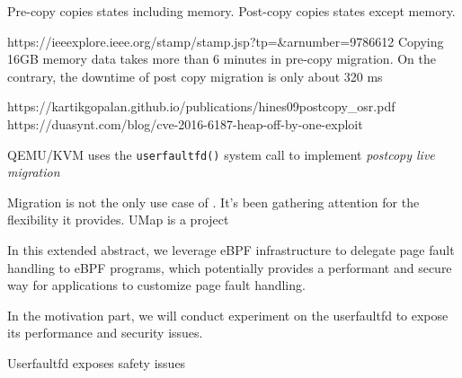 

Pre-copy copies states including memory. Post-copy copies states except memory.


https://ieeexplore.ieee.org/stamp/stamp.jsp?tp=&arnumber=9786612
Copying 16GB memory data takes more than 6 minutes in
pre-copy migration. On the contrary, the downtime of post copy migration is only about 320 ms


https://kartikgopalan.github.io/publications/hines09postcopy_osr.pdf
https://duasynt.com/blog/cve-2016-6187-heap-off-by-one-exploit


QEMU/KVM uses the \texttt{userfaultfd()} system call to implement \textit{postcopy live migration}


Migration is not the only use case of \uffd. It's been gathering attention for the flexibility it provides. UMap\cite{file-backed-article, file-backed-proceeding} is a project 



In this extended abstract, we leverage eBPF infrastructure to delegate page fault handling to eBPF programs, which potentially provides a performant and secure way for applications to customize page fault handling.



In the motivation part, we will conduct experiment on the userfaultfd to expose its performance and security issues.



Userfaultfd exposes safety issues 